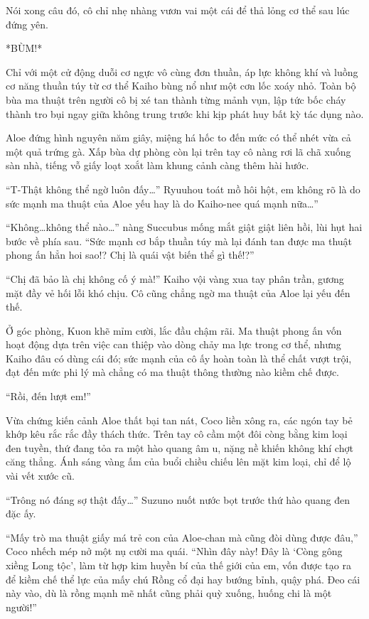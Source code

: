 ﻿\documentclass[../main.tex]{subfiles}
\begin{document}
Nói xong câu đó, cô chỉ nhẹ nhàng vươn vai một cái để thả lỏng cơ thể sau lúc đứng yên.

*BÙM!*

Chỉ với một cử động duỗi cơ ngực vô cùng đơn thuần, áp lực không khí và luồng cơ năng thuần túy từ cơ thể Kaiho bùng nổ như một cơn lốc xoáy nhỏ. Toàn bộ bùa ma thuật trên người cô bị xé tan thành từng mảnh vụn, lập tức bốc cháy thành tro bụi ngay giữa không trung trước khi kịp phát huy bất kỳ tác dụng nào.

Aloe đứng hình nguyên năm giây, miệng há hốc to đến mức có thể nhét vừa cả một quả trứng gà. Xấp bùa dự phòng còn lại trên tay cô nàng rơi lã chã xuống sàn nhà, tiếng vỗ giấy loạt xoắt làm khung cảnh càng thêm hài hước.

``T-Thật không thể ngờ luôn đấy\dots'' Ryuuhou toát mồ hôi hột, em không rõ là do sức mạnh ma thuật của Aloe yếu hay là do Kaiho-nee quá mạnh nữa\dots''

``Không\dots không thể nào\dots'' nàng Succubus mống mắt giật giật liên hồi, lùi hụt hai bước về phía sau. ``Sức mạnh cơ bắp thuần túy mà lại đánh tan được ma thuật phong ấn hẳn hoi sao!? Chị là quái vật biến thể gì thế!?''

``Chị đã bảo là chị không cố ý mà!'' Kaiho vội vàng xua tay phân trần, gương mặt đầy vẻ hối lỗi khó chịu. Cô cũng chẳng ngờ ma thuật của Aloe lại yếu đến thế.

Ở góc phòng, Kuon khẽ mỉm cười, lắc đầu chậm rãi. Ma thuật phong ấn vốn hoạt động dựa trên việc can thiệp vào dòng chảy ma lực trong cơ thể, nhưng Kaiho đâu có dùng cái đó; sức mạnh của cô ấy hoàn toàn là thể chất vượt trội, đạt đến mức phi lý mà chẳng có ma thuật thông thường nào kiềm chế được.

\ct

``Rồi, đến lượt em!''

Vừa chứng kiến cảnh Aloe thất bại tan nát, Coco liền xông ra, các ngón tay bẻ khớp kêu rắc rắc đầy thách thức. Trên tay cô cầm một đôi còng bằng kim loại đen tuyền, thứ đang tỏa ra một hào quang âm u, nặng nề khiến không khí chợt căng thẳng. Ánh sáng vàng ấm của buổi chiều chiếu lên mặt kim loại, chỉ để lộ vài vết xước cũ.

``Trông nó đáng sợ thật đấy\dots'' Suzuno nuốt nước bọt trước thứ hào quang đen đặc ấy.

``Mấy trò ma thuật giấy má trẻ con của Aloe-chan mà cũng đòi dùng được đâu,'' Coco nhếch mép nở một nụ cười ma quái. ``Nhìn đây này! Đây là `Còng gông xiềng Long tộc', làm từ hợp kim huyền bí của thế giới của em, vốn được tạo ra để kiềm chế thể lực của mấy chú Rồng cổ đại hay bướng bỉnh, quậy phá. Đeo cái này vào, dù là rồng mạnh mẽ nhất cũng phải quỳ xuống, huống chi là một người!''
\end{document}
